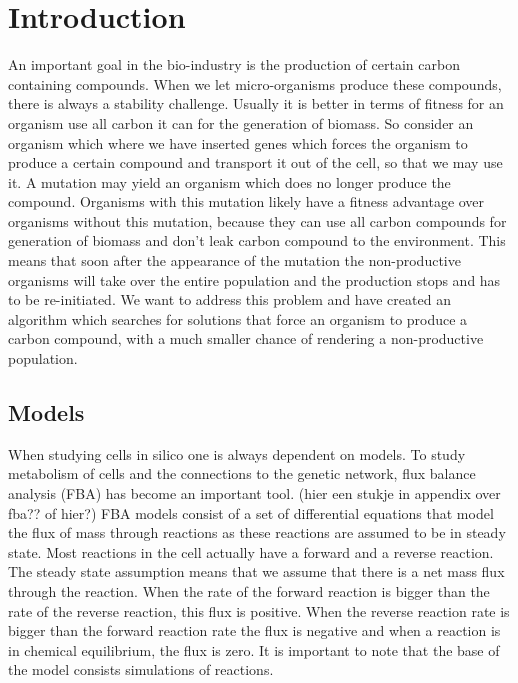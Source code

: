 \documentclass[12pt]{report}
\begin{document}
\section{Introduction}
An important goal in the bio-industry is the production of certain carbon containing compounds. When we let micro-organisms produce these compounds, there is always a stability challenge. Usually it is better in terms of fitness for an organism use all carbon it can for the generation of biomass. So consider an organism which where we have inserted genes which forces the organism to produce a certain compound and transport it out of the cell, so that we may use it. A mutation may yield an organism which does no longer produce the compound. Organisms with this mutation likely have a fitness advantage over organisms without this mutation, because they can use all carbon compounds for generation of biomass and don't leak carbon compound to the environment. This means that soon after the appearance of the mutation the non-productive organisms will take over the entire population and the production stops and has to be re-initiated. We want to address this problem and have created an algorithm which searches for solutions that force an organism to produce a carbon compound, with a much smaller chance of rendering a non-productive population.

\subsection{Models}\label{sec:intro_models}
When studying cells in silico one is always dependent on models. To study metabolism of cells and the connections to the genetic network, flux balance analysis (FBA) has become an important tool. (hier een stukje in appendix over fba?? of hier?)
FBA models consist of a set of differential equations that model the flux of mass through reactions as these reactions are assumed to be in steady state. Most reactions in the cell actually have a forward and a reverse reaction. The steady state assumption means that we assume that there is a net mass flux through the reaction. When the rate of the forward reaction is bigger than the rate of the reverse reaction, this flux is positive. When the reverse reaction rate is bigger than the forward reaction rate the flux is negative and when a reaction is in chemical equilibrium, the flux is zero.
It is important to note that the base of the model consists simulations of reactions.
\end{document}
